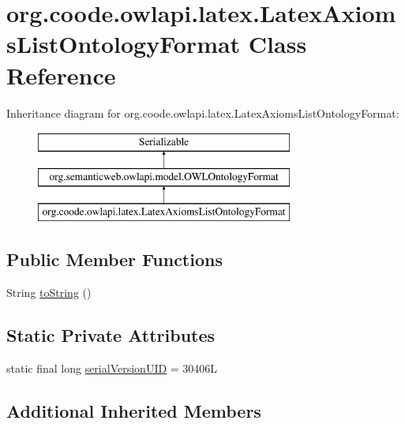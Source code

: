 \hypertarget{classorg_1_1coode_1_1owlapi_1_1latex_1_1_latex_axioms_list_ontology_format}{\section{org.\-coode.\-owlapi.\-latex.\-Latex\-Axioms\-List\-Ontology\-Format Class Reference}
\label{classorg_1_1coode_1_1owlapi_1_1latex_1_1_latex_axioms_list_ontology_format}
}
Inheritance diagram for org.\-coode.\-owlapi.\-latex.\-Latex\-Axioms\-List\-Ontology\-Format\-:\begin{figure}[H]
\begin{center}
\leavevmode
\includegraphics[height=3.000000cm]{classorg_1_1coode_1_1owlapi_1_1latex_1_1_latex_axioms_list_ontology_format}
\end{center}
\end{figure}
\subsection*{Public Member Functions}
\begin{DoxyCompactItemize}
\item 
String \hyperlink{classorg_1_1coode_1_1owlapi_1_1latex_1_1_latex_axioms_list_ontology_format_a39e400dfac24dbd8bc94860059dce814}{to\-String} ()
\end{DoxyCompactItemize}
\subsection*{Static Private Attributes}
\begin{DoxyCompactItemize}
\item 
static final long \hyperlink{classorg_1_1coode_1_1owlapi_1_1latex_1_1_latex_axioms_list_ontology_format_a2782bf484df58c33914c202b4250986e}{serial\-Version\-U\-I\-D} = 30406\-L
\end{DoxyCompactItemize}
\subsection*{Additional Inherited Members}


